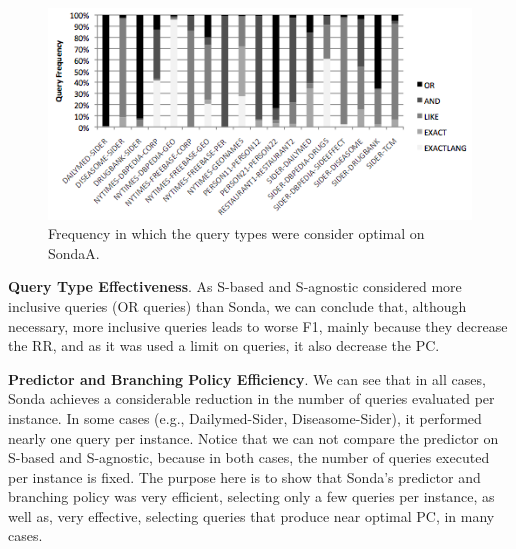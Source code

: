  \begin{figure} [h]
\vspace{-10pt}
\centering
\includegraphics[scale=0.5]{p8.png}
\caption{Frequency in which the query types were consider optimal on SondaA.} 
\vspace{-10pt}
\label{fig:frequency}
\end{figure}


\textbf{Query Type Effectiveness}. As S-based and S-agnostic considered more inclusive queries (OR queries) than Sonda, we can conclude that, although necessary, more inclusive queries leads to worse F1, mainly because they decrease the RR, and as it was used a limit on queries, it also decrease the PC. 



\textbf{Predictor and Branching Policy Efficiency}. We can see that in all cases, Sonda achieves a considerable reduction in the number of queries evaluated per instance. In some cases (e.g., Dailymed-Sider, Diseasome-Sider), it performed nearly one query per instance. Notice that we can not compare the predictor on S-based and S-agnostic, because in both cases, the number of queries executed per instance is fixed. The purpose here is to show  that Sonda's predictor and branching policy was very efficient, selecting only a few queries per instance, as well as, very effective, selecting queries that produce near optimal PC, in many cases. 


